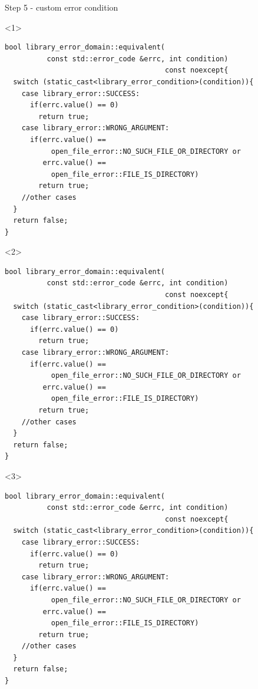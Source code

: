 \documentclass[10pt]{beamer}
\begin{document}
\begin{frame}[fragile]{Step 5 - custom error condition}
	\begin{onlyenv}
	\begin{verbatim}
bool library_error_domain::equivalent(
          const std::error_code &errc, int condition) 
                                      const noexcept{                     
  switch (static_cast<library_error_condition>(condition)){
    case library_error::SUCCESS:
      if(errc.value() == 0)
        return true;
    case library_error::WRONG_ARGUMENT:
      if(errc.value() == 
           open_file_error::NO_SUCH_FILE_OR_DIRECTORY or
         errc.value() == 
           open_file_error::FILE_IS_DIRECTORY)
        return true;
    //other cases    
  }
  return false;
}
	\end{verbatim}
	\end{onlyenv}

	\begin{onlyenv}
	\begin{verbatim}
bool library_error_domain::equivalent(
          const std::error_code &errc, int condition) 
                                      const noexcept{                     
  switch (static_cast<library_error_condition>(condition)){
    case library_error::SUCCESS:
      if(errc.value() == 0)
        return true;
    case library_error::WRONG_ARGUMENT:
      if(errc.value() == 
           open_file_error::NO_SUCH_FILE_OR_DIRECTORY or
         errc.value() == 
           open_file_error::FILE_IS_DIRECTORY)
        return true;
    //other cases    
  }
  return false;
}
	\end{verbatim}
	\end{onlyenv}

	\begin{onlyenv}
	\begin{verbatim}
bool library_error_domain::equivalent(
          const std::error_code &errc, int condition) 
                                      const noexcept{                     
  switch (static_cast<library_error_condition>(condition)){
    case library_error::SUCCESS:
      if(errc.value() == 0)
        return true;
    case library_error::WRONG_ARGUMENT:
      if(errc.value() == 
           open_file_error::NO_SUCH_FILE_OR_DIRECTORY or
         errc.value() == 
           open_file_error::FILE_IS_DIRECTORY)
        return true;
    //other cases    
  }
  return false;
}
	\end{verbatim}
	\end{onlyenv}
\end{frame}
\end{document}
